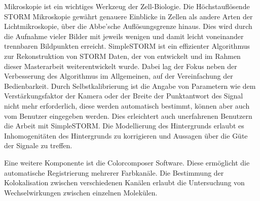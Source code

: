 Mikroskopie ist ein wichtiges Werkzeug der Zell-Biologie. Die H\"ochstaufl\"osende STORM Mikroskopie gew\"ahrt genauere Einblicke in Zellen als andere Arten der Lichtmikroskopie, \"uber die Abbe'sche Aufl\"osungsgrenze hinaus. Dies wird durch die Aufnahme vieler Bilder mit jeweils wenigen und damit leicht voneinander trennbaren Bildpunkten erreicht.\newline
SimpleSTORM ist ein effizienter Algorithmus zur Rekonstruktion von STORM Daten, der von \cite{MAJoachim} entwickelt und im Rahmen dieser Masterarbeit weiterentwickelt wurde.\newline 
Dabei lag der Fokus neben der Verbesserung des Algorithmus im Allgemeinen, auf der Vereinfachung der Bedienbarkeit. Durch Selbstkalibrierung ist die Angabe von Parametern wie dem Verst\"arkungsfaktor der Kamera oder der Breite der Punktantwort des Signal nicht mehr erforderlich, diese werden automatisch bestimmt, k\"onnen aber auch vom Benutzer eingegeben werden. Dies erleichtert auch unerfahrenen Benutzern die Arbeit mit SimpleSTORM.\newline
Die Modellierung des Hintergrunds erlaubt es Inhomogenit\"aten des Hintergrunds zu korrigieren und Aussagen \"uber die G\"ute der Signale zu treffen.\newline

Eine weitere Komponente ist die Colorcomposer Software. Diese erm\"oglicht die automatische Registrierung mehrerer Farbkan\"ale. Die Bestimmung der Kolokalisation zwischen verschiedenen Kan\"alen erlaubt die Untersuchung von Wechselwirkungen zwischen einzelnen Molek\"ulen.